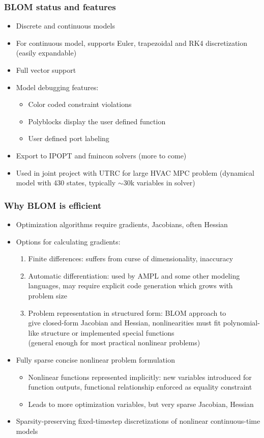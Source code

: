 \documentclass[mathserif]{beamer}
\begin{document}
\begin{frame}
\frametitle{BLOM status and features}
\begin{itemize}
\item Discrete and continuous models
\item For continuous model, supports Euler, trapezoidal and RK4 discretization
  (easily expandable)
\item Full vector support
\item Model debugging features: 
\begin{itemize}
\item Color coded constraint violations
\item Polyblocks display the user defined function
\item User defined port labeling
\end{itemize}
\item Export to IPOPT and fmincon solvers (more to come)
\item Used in joint project with UTRC for large HVAC MPC problem (dynamical
  model with 430 states, typically $\sim30$k variables in solver)
\end{itemize}



\end{frame}

\begin{frame}
\frametitle{Why BLOM is efficient}
\begin{itemize}
\item Optimization algorithms require gradients, Jacobians, often Hessian
\item Options for calculating gradients:
\begin{enumerate}
\item Finite differences: suffers from curse of dimensionality, inaccuracy
\item Automatic differentiation: used by AMPL and some other modeling languages, may require explicit code generation which grows with problem size
\item Problem representation in structured form: BLOM approach to \\
give closed-form Jacobian and Hessian, nonlinearities must fit polynomial-like structure or implemented special functions \\
(general enough for most practical nonlinear problems)
\end{enumerate}
\item Fully sparse concise nonlinear problem formulation
\begin{itemize}
\item Nonlinear functions represented implicitly: new variables introduced for function outputs, functional relationship enforced as equality constraint
\item Leads to more optimization variables, but very sparse Jacobian, Hessian
\end{itemize}
\item Sparsity-preserving fixed-timestep discretizations of nonlinear continuous-time models

\end{itemize}
\end{frame}
\end{document}
